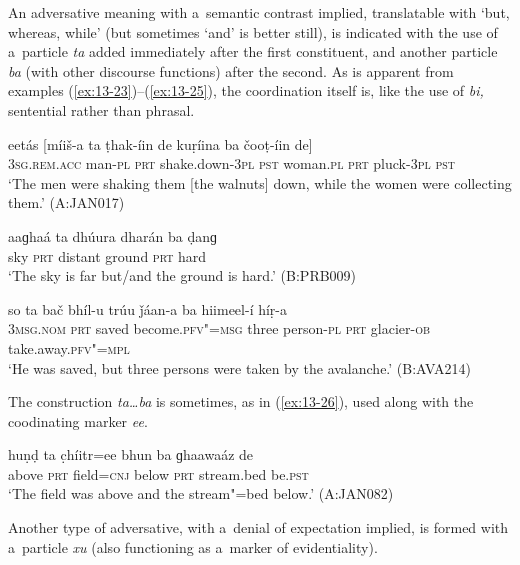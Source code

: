  An adversative meaning with a~semantic contrast implied, translatable with `but, whereas, while' (but sometimes `and' is better still), is indicated with the use of a~particle \textit{ta} added immediately after the first constituent, and another particle \textit{ba} (with other discourse functions) after the second. As is apparent from examples (\ref{ex:13-23})--(\ref{ex:13-25}), the coordination itself is, like the use of \textit{bi,} sentential rather than phrasal.

\begin{exe}
\ex
\label{ex:13-23}
\gll eetás [míiš-a ta ṭhak-íin de kuṛíina ba čooṭ-íin de] \\
\textsc{3sg.rem.acc} man-\textsc{pl} \textsc{prt} shake.down-\textsc{3pl} \textsc{pst} woman.\textsc{pl} \textsc{prt} pluck-\textsc{3pl} \textsc{pst} \\
\glt `The men were shaking them [the walnuts] down, while the women were collecting them.' (A:JAN017)

\ex
\label{ex:13-24}
\gll aaɡhaá ta dhúura dharán ba ḍanɡ  \\
sky \textsc{prt} distant ground \textsc{prt} hard \\
\glt `The sky is far but/and the ground is hard.' (B:PRB009)

\ex
\label{ex:13-25}
\gll so ta bač bhíl-u trúu ǰáan-a ba hiimeel-í híṛ-a \\
\textsc{3msg.nom} \textsc{prt} saved become.\textsc{pfv"=msg} three person-\textsc{pl} \textsc{prt } glacier-\textsc{ob} take.away.\textsc{pfv"=mpl}  \\
\glt `He was saved, but three persons were taken by the avalanche.' (B:AVA214) 
\end{exe}

The construction \textit{ta{\ldots}ba} is sometimes, as in (\ref{ex:13-26}), used along with the coodinating marker \textit{ee}.

\begin{exe}
\ex
\label{ex:13-26}
\gll huṇḍ ta c̣híitr=ee bhun ba ɡhaawaáz de \\
above \textsc{prt} field=\textsc{cnj} below \textsc{prt} stream.bed be.\textsc{pst} \\
\glt `The field was above and the stream"=bed below.' (A:JAN082) 
\end{exe}


 Another type of adversative, with a~denial of expectation implied, is formed with a~particle \textit{xu} (also functioning as a~marker of evidentiality).

